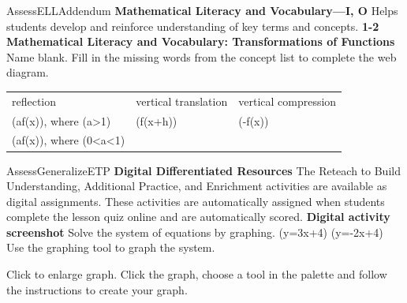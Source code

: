 \documentclass{article}
\newenvironment{te-addendum}[2]{}{}     %
\newcommand{\answer}[1]{}               %
\newcommand{\placeholder}[2]{}          %
\newcommand{\te}[1]{}                   %
\begin{document}
\begin{te-addendum}{Assess}{ELLAddendum}
\textbf{Mathematical Literacy and Vocabulary—I, O}
Helps students develop and reinforce understanding of key terms and concepts.
\textbf{1-2 Mathematical Literacy and Vocabulary: Transformations of Functions}
Name blank.
Fill in the missing words from the concept list to complete the web diagram.
\begin{tabular}{lll}
reflection & vertical translation & vertical compression \\
(af(x)), where (a>1) & (f(x+h)) & (-f(x)) \\
(af(x)), where (0<a<1) & & \\
\end{tabular}
\placeholder{diagram}{Web diagram: central hexagon “Transformations of the parent function f.” Five branches lead to rectangles: top reflection, left vertical translation, right horizontal translation, lower-left vertical stretch, lower-right vertical compression. Top rectangle branches to circles f(-x) and -f(x); left to circle f(x)+c; right to circle f(x+h); lower-left to circle af(x), where a>1; lower-right to circle af(x), where 0<a<1. Magenta printed answers fill reflection, -f(x), vertical translation, f(x+h), af(x) where a>1, vertical compression, af(x) where 0<a<1.}
\answer{reflection; (-f(x)); vertical translation; (f(x+h)); (af(x)), where (a>1); vertical compression; (af(x)), where (0<a<1).}
\end{te-addendum}
\begin{te-addendum}{Assess}{GeneralizeETP}
\textbf{Digital Differentiated Resources}
The Reteach to Build Understanding, Additional Practice, and Enrichment activities are available as digital assignments. These activities are automatically assigned when students complete the lesson quiz online and are automatically scored.
\textbf{Digital activity screenshot}
Solve the system of equations by graphing.
(y=3x+4)
(y=-2x+4)
Use the graphing tool to graph the system.
\placeholder{graph}{Digital exercise blank Cartesian grid with x/y axes and arrowheads, origin O, unit grid lines, numbered -10,-8,-6,-4,-2,2,4,6,8,10 on both axes. Window [-10,10] by [-10,10]; no functions or points plotted. Question Help menu overlays upper-right quadrant.}
Click to enlarge graph.
Click the graph, choose a tool in the palette and follow the instructions to create your graph.
\te{Interface labels: Exit; Question Help; Help Me Solve This; View an Example; Video; Textbook; Glossary; Math Tools; Print; 1 part remaining; Clear All; Check Answer; Review progress; Question 5 of 14; Go; Back; Next. Resource previews bear “enVision Algebra 2 • Teaching Resources,” SavvasRealize.com, and a copyright notice.}
\end{te-addendum}
\end{document}
